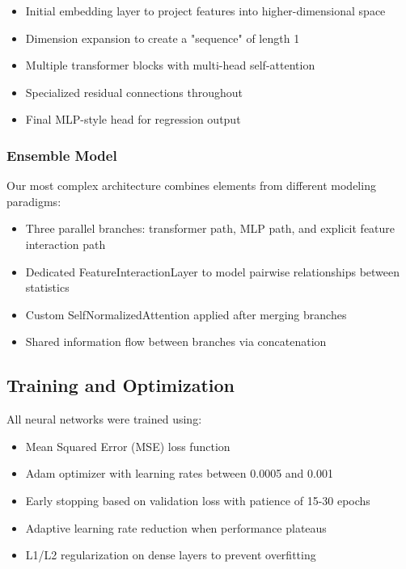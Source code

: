 \documentclass[10pt,twocolumn,letterpaper]{article}
\begin{document}
\begin{itemize}
    \item Initial embedding layer to project features into higher-dimensional space
    \item Dimension expansion to create a "sequence" of length 1
    \item Multiple transformer blocks with multi-head self-attention
    \item Specialized residual connections throughout
    \item Final MLP-style head for regression output
\end{itemize}

\subsubsection{Ensemble Model}
Our most complex architecture combines elements from different modeling paradigms:

\begin{itemize}
    \item Three parallel branches: transformer path, MLP path, and explicit feature interaction path
    \item Dedicated FeatureInteractionLayer to model pairwise relationships between statistics
    \item Custom SelfNormalizedAttention applied after merging branches
    \item Shared information flow between branches via concatenation
\end{itemize}

\subsection{Training and Optimization}

All neural networks were trained using:
\begin{itemize}
    \item Mean Squared Error (MSE) loss function
    \item Adam optimizer with learning rates between 0.0005 and 0.001
    \item Early stopping based on validation loss with patience of 15-30 epochs
    \item Adaptive learning rate reduction when performance plateaus
    \item L1/L2 regularization on dense layers to prevent overfitting
\end{itemize}
\end{document}
